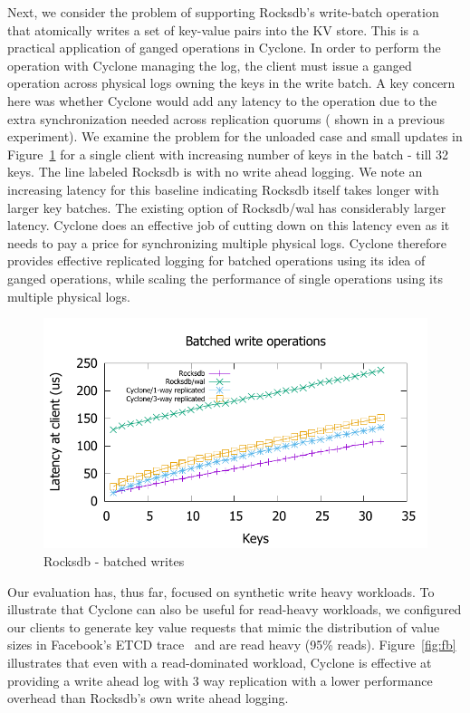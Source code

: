 \documentclass[pageno]{jpaper}
\begin{document}
Next, we consider the problem of supporting Rocksdb's write-batch operation that
atomically writes a set of key-value pairs into the KV store. This is a
practical application of ganged operations in Cyclone. In order to
perform the operation with Cyclone managing the log, the client must issue a
ganged operation across physical logs owning the keys in the write batch.
A key concern here was whether Cyclone would add any latency to the
operation due to the extra synchronization needed across replication quorums (
shown in a previous experiment).
We examine the problem for the unloaded case
and small updates in Figure~\ref{fig:rocksdb_multi} for a single client with
increasing number of keys in the batch - till 32 keys.
The line labeled Rocksdb is with no write ahead logging. We
note an increasing latency for this baseline indicating Rocksdb itself takes longer
with larger key batches. The existing option of Rocksdb/wal has considerably
larger latency. Cyclone does an effective job of cutting down on this latency
even as it needs to pay a price for synchronizing multiple physical
logs. Cyclone therefore provides effective replicated logging for batched
operations using its idea of ganged operations, while scaling the performance of
single operations using its multiple physical logs.

\begin{figure}
\includegraphics[scale=0.6]{results2/rocksdb_multi.pdf}
\caption{Rocksdb - batched writes}
\label{fig:rocksdb_multi}
\end{figure}

Our evaluation has, thus far, focused on synthetic write heavy
workloads. To illustrate that Cyclone can also be useful for read-heavy
workloads, we configured our clients to generate key value requests that mimic
the distribution of value sizes in Facebook's ETCD
trace~\cite{fb_workload_analysis,fb_scaling_memcache} and are read
heavy (95\% reads). Figure~\ref{fig:fb} illustrates that even with a
read-dominated workload, Cyclone is effective at providing a write ahead log
with 3 way replication with a lower performance overhead than Rocksdb's own
write ahead logging.
\end{document}
